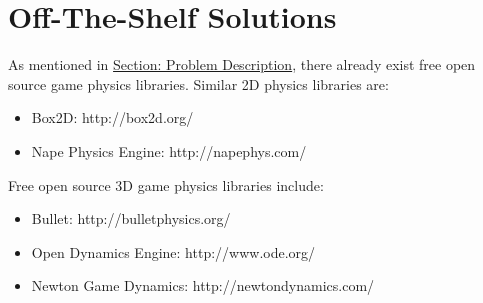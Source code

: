\documentclass[12pt]{article}
\begin{document}
\section{Off-The-Shelf Solutions}
\label{Sec:ExistingSolns}
As mentioned in \hyperref[Sec:ProbDesc]{Section: Problem Description}, there already exist free open source game physics libraries. Similar 2D physics libraries are:
\begin{itemize}
\item{Box2D: http://box2d.org/}
\item{Nape Physics Engine: http://napephys.com/}
\end{itemize}
Free open source 3D game physics libraries include:
\begin{itemize}
\item{Bullet: http://bulletphysics.org/}
\item{Open Dynamics Engine: http://www.ode.org/}
\item{Newton Game Dynamics: http://newtondynamics.com/}
\end{itemize}
\end{document}

